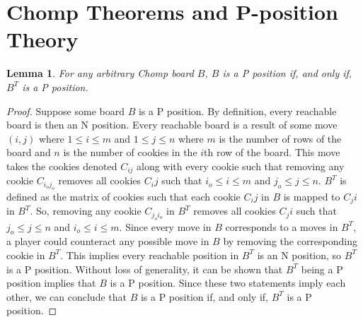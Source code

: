 \documentclass{amsart}
\newtheorem{lem}[thm]{Lemma}
\theoremstyle{definition}
\theoremstyle{remark}
\numberwithin{equation}{section}
\begin{document}











\section{Chomp Theorems and P-position Theory}



\begin{lem}
	\label{lem:tr}
	For any arbitrary Chomp board $B$, $B$ is a P position if, and only if, $B^T$ is a P position.
\end{lem}


\begin{proof}
	Suppose some board $B$ is a P position.  By definition, every reachable board is then an N position.  Every reachable board is a result of some move $(i,j)$ where $1\leq i \leq m$ and $1\leq j \leq n$ where $m$ is the number of rows of the board and $n$ is the number of cookies in the $i$th row of the board.  This move takes the cookies denoted $C_{ij}$ along with every cookie such that removing any cookie $C_{i_oj_o}$ removes all cookies $C_ij$ such that $i_o \leq i\leq m$ and $j_o\leq j \leq n$.  $B^T$ is defined as the matrix of cookies such that each cookie $C_ij$ in $B$ is mapped to $C_ji$ in $B^T$.  So, removing any cookie $C_{j_oi_o}$ in $B^T$ removes all cookies   $C_ji$ such that $j_o\leq j \leq n$ and $i_o \leq i\leq m$.  Since every move in $B$ corresponds to a moves in $B^T$, a player could counteract any possible move in $B$ by removing the corresponding cookie in $B^T$.  This implies every reachable position in $B^T$ is an N position, so $B^T$ is a P position.  Without loss of generality, it can be shown that $B^T$ being a P position implies that $B$ is a P position.  Since these two statements imply each other, we can conclude that $B$ is a P position if, and only if, $B^T$ is a P position.
\end{proof}
\end{document}
